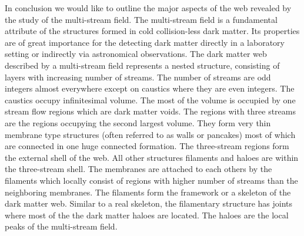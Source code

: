 



In conclusion we would like  to outline the major aspects of the web revealed by the study of the multi-stream field.
The multi-stream field is a fundamental attribute of the structures formed in cold collision-less dark matter. Its properties
are of great importance for the detecting dark matter directly in a laboratory setting or indirectly via astronomical observations.
The dark matter web described by a multi-stream field represents a nested structure, consisting of layers with increasing number of streams.
The number of streams are odd integers almost everywhere except on caustics where they are even integers.
The caustics  occupy infinitesimal volume. The most of the volume is occupied by one stream flow regions which
are dark matter voids. The regions with three streams are the regions occupying the second largest volume.
They form very thin membrane type structures (often referred to as walls or pancakes) most of which are connected 
in one huge connected formation. The three-stream regions form the external shell of the web. All other structures
filaments and haloes are within the three-stream shell.
 The membranes are attached to each others by the filaments which locally consist of regions with higher number of streams  than
the neighboring membranes. The filaments form the framework or a skeleton of the dark matter web.  Similar to a real skeleton, the filamentary structure has joints where most of the the dark matter haloes are located. The haloes are the local peaks of the multi-stream field.






%
%

%
